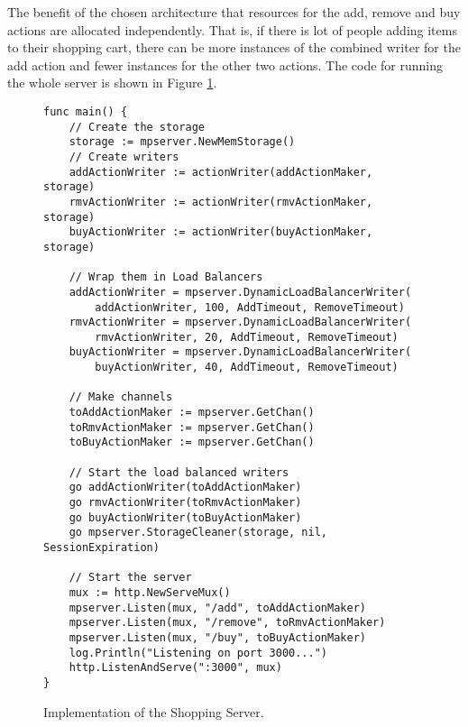 The benefit of the chosen architecture that resources for the add, remove
and buy actions are allocated independently. That is, if there is lot of 
people adding items to their shopping cart, there can be more instances
of the combined writer for the add action and fewer instances for the
other two actions. The code for running the whole server is shown
in Figure \ref{fig:ShoppingCode}.
\begin{figure}[h]
\begin{lstlisting}
func main() {
    // Create the storage
    storage := mpserver.NewMemStorage()
    // Create writers
    addActionWriter := actionWriter(addActionMaker, storage)
    rmvActionWriter := actionWriter(rmvActionMaker, storage)
    buyActionWriter := actionWriter(buyActionMaker, storage)

    // Wrap them in Load Balancers
    addActionWriter = mpserver.DynamicLoadBalancerWriter(
        addActionWriter, 100, AddTimeout, RemoveTimeout)
    rmvActionWriter = mpserver.DynamicLoadBalancerWriter(
        rmvActionWriter, 20, AddTimeout, RemoveTimeout)
    buyActionWriter = mpserver.DynamicLoadBalancerWriter(
        buyActionWriter, 40, AddTimeout, RemoveTimeout)

    // Make channels
    toAddActionMaker := mpserver.GetChan()
    toRmvActionMaker := mpserver.GetChan()
    toBuyActionMaker := mpserver.GetChan()

    // Start the load balanced writers
    go addActionWriter(toAddActionMaker)
    go rmvActionWriter(toRmvActionMaker)
    go buyActionWriter(toBuyActionMaker)
    go mpserver.StorageCleaner(storage, nil, SessionExpiration)

    // Start the server
    mux := http.NewServeMux()
    mpserver.Listen(mux, "/add", toAddActionMaker)
    mpserver.Listen(mux, "/remove", toRmvActionMaker)
    mpserver.Listen(mux, "/buy", toBuyActionMaker)
    log.Println("Listening on port 3000...")
    http.ListenAndServe(":3000", mux)
}
\end{lstlisting}
\caption[scale=1.0]{Implementation of the Shopping Server.}
\label{fig:ShoppingCode}
\end{figure}



